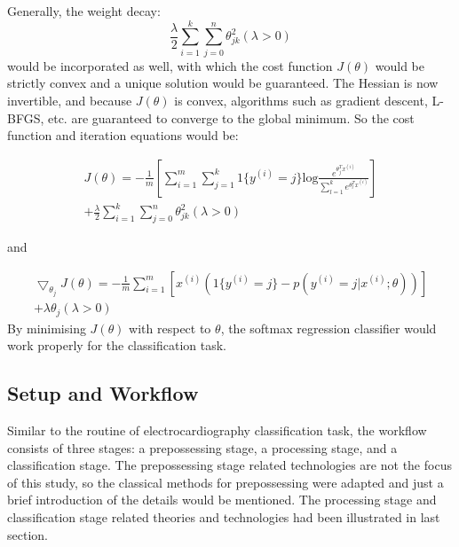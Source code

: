 \documentclass[journal]{IEEEtran}
\begin{document}
Generally, the weight decay:
\begin{equation}
\frac{\lambda}{2} \sum_{i=1}^k \sum_{j=0}^n \theta_{jk}^2 (\lambda>0)
\end{equation}
would be incorporated as well, with which the cost function $J(\theta)$ would be strictly convex and a unique solution would be guaranteed. The Hessian is now invertible, and because $J(θ)$ is convex, algorithms such as gradient descent, L-BFGS, etc. are guaranteed to converge to the global minimum.
So the cost function and iteration equations would be:

\begin{equation}
\begin{split}
J(\theta) = -\frac{1}{m}[\sum_{i=1}^m\sum_{j=1}^k1\{y^{(i)}=j\}\text{log}{\frac{e^{\theta_j^Tx^{(i)}}}{\sum_{l=1}^ke^{\theta_l^Tx^{(i)}}}}] \\
+ \frac{\lambda}{2} \sum_{i=1}^k \sum_{j=0}^n \theta_{jk}^2 (\lambda>0)
\end{split}
\end{equation}

and

\begin{equation}
\begin{split}
\bigtriangledown_{\theta_j}J(\theta) = -\frac{1}{m}\sum_{i=1}^m[x^{(i)}(1\{y^{(i)}=j\}-p(y^{(i)}=j|x^{(i)};\theta))] \\
+ \lambda\theta_j  (\lambda>0)
\end{split}
\end{equation}
By minimising $J(\theta)$ with respect to $\theta$, the softmax regression classifier would work properly for the classification task.

\subsection{Setup and Workflow}
Similar to the routine of electrocardiography classification task, the workflow consists of three stages: a prepossessing stage, a processing stage, and a classification stage. The prepossessing stage related technologies are not the focus of this study, so the classical methods for prepossessing were adapted and just a brief introduction of the details would be mentioned. The processing stage and classification stage related theories and technologies had been illustrated in last section. 
\end{document}
